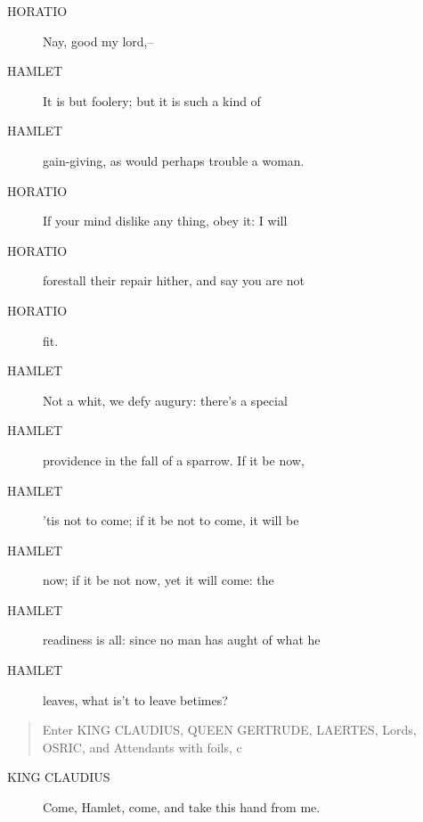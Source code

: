 \documentclass{article}
\begin{document}
\begin{description}
            
\item[HORATIO] Nay, good my lord,--
\end{description}
          
\begin{description}
            
\item[HAMLET] It is but foolery; but it is such a kind of
\item[HAMLET] gain-giving, as would perhaps trouble a woman.
\end{description}
          
\begin{description}
            
\item[HORATIO] If your mind dislike any thing, obey it: I will
\item[HORATIO] forestall their repair hither, and say you are not
\item[HORATIO] fit.
\end{description}
          
\begin{description}
            
\item[HAMLET] Not a whit, we defy augury: there's a special
\item[HAMLET] providence in the fall of a sparrow. If it be now,
\item[HAMLET] 'tis not to come; if it be not to come, it will be
\item[HAMLET] now; if it be not now, yet it will come: the
\item[HAMLET] readiness is all: since no man has aught of what he
\item[HAMLET] leaves, what is't to leave betimes?
\end{description}
          
\begin{quote}
Enter KING CLAUDIUS, QUEEN GERTRUDE, LAERTES,
Lords, OSRIC, and Attendants with foils, c
\end{quote}
          
\begin{description}
            
\item[KING CLAUDIUS] Come, Hamlet, come, and take this hand from me.
\end{description}
          
\end{document}
